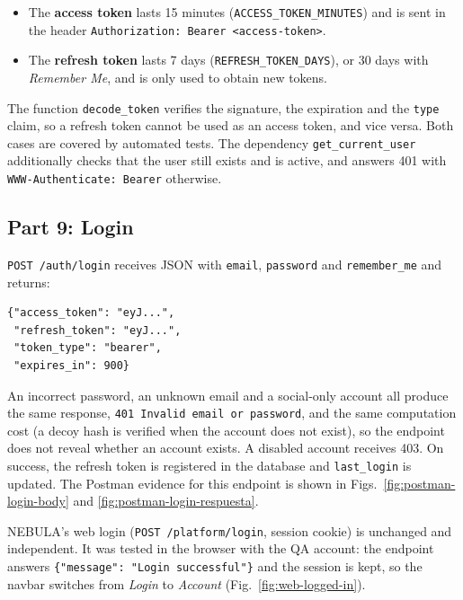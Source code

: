 \documentclass[9pt,a4paper,twocolumn]{article}
\begin{document}
\begin{itemize}
    \item The \textbf{access token} lasts 15 minutes (\texttt{ACCESS\_TOKEN\_MINUTES}) and is sent in the header \texttt{Authorization: Bearer <access-token>}.
    \item The \textbf{refresh token} lasts 7 days (\texttt{REFRESH\_TOKEN\_DAYS}), or 30 days with \textit{Remember Me}, and is only used to obtain new tokens.
\end{itemize}

The function \texttt{decode\_token} verifies the signature, the expiration and the \texttt{type} claim, so a refresh token cannot be used as an access token, and vice versa. Both cases are covered by automated tests. The dependency \texttt{get\_current\_user} additionally checks that the user still exists and is active, and answers 401 with \texttt{WWW-Authenticate: Bearer} otherwise.

\subsection{Part 9: Login}

\texttt{POST /auth/login} receives JSON with \texttt{email}, \texttt{password} and \texttt{remember\_me} and returns:

\begin{lstlisting}[basicstyle=\ttfamily\footnotesize]
{"access_token": "eyJ...",
 "refresh_token": "eyJ...",
 "token_type": "bearer",
 "expires_in": 900}
\end{lstlisting}

An incorrect password, an unknown email and a social-only account all produce the same response, \texttt{401 Invalid email or password}, and the same computation cost (a decoy hash is verified when the account does not exist), so the endpoint does not reveal whether an account exists. A disabled account receives 403. On success, the refresh token is registered in the database and \texttt{last\_login} is updated. The Postman evidence for this endpoint is shown in Figs.~\ref{fig:postman-login-body} and \ref{fig:postman-login-respuesta}.

NEBULA's web login (\texttt{POST /platform/login}, session cookie) is unchanged and independent. It was tested in the browser with the QA account: the endpoint answers \texttt{\{"message": "Login successful"\}} and the session is kept, so the navbar switches from \textit{Login} to \textit{Account} (Fig.~\ref{fig:web-logged-in}).
\end{document}
